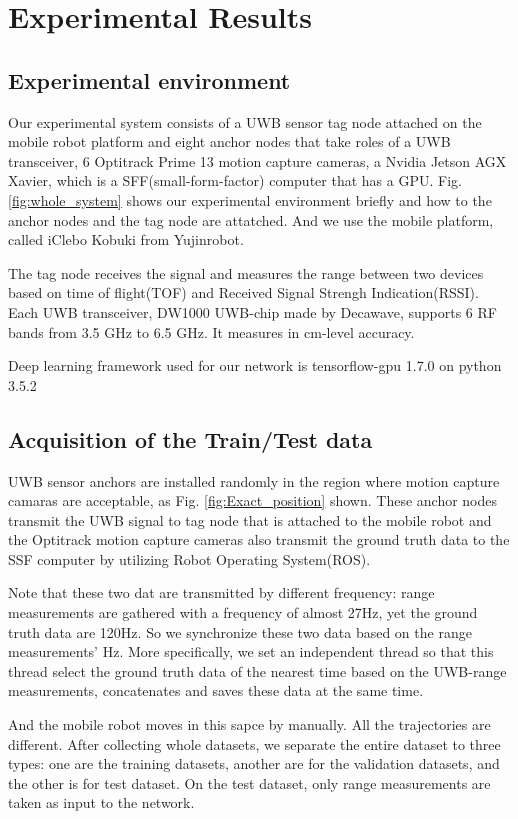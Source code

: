 \documentclass[letterpaper, 10 pt, conference]{ieeeconf}  %
\begin{document}
\section{Experimental Results}
\subsection{Experimental environment}

Our experimental system consists of a UWB sensor tag node attached on the mobile robot platform  and eight anchor nodes that take roles of a UWB transceiver, 6 Optitrack Prime 13 motion capture cameras, a Nvidia Jetson AGX Xavier, which is a SFF(small-form-factor) computer that has a GPU. Fig. \ref{fig:whole_system} shows our experimental environment briefly and how to the anchor nodes and the tag node are attatched. And we use the mobile platform, called iClebo Kobuki from Yujinrobot.

The tag node receives the signal and measures the range between two devices based on time of flight(TOF) and Received Signal Strengh Indication(RSSI). Each UWB transceiver, DW1000 UWB-chip made by Decawave, supports 6 RF bands from 3.5 GHz to 6.5 GHz. It measures in cm-level accuracy.

 Deep learning framework used for our network is tensorflow-gpu 1.7.0 on python 3.5.2
 
\subsection{Acquisition of the Train/Test data}
UWB sensor anchors are installed randomly in the region where motion capture camaras are acceptable, as Fig. \ref{fig:Exact_position} shown. These anchor nodes transmit the UWB signal to tag node that is attached to the mobile robot and the Optitrack motion capture cameras also transmit the ground truth data to the SSF computer by utilizing Robot Operating System(ROS).

Note that these two dat are transmitted by different frequency: range measurements are gathered with a frequency of almost 27Hz, yet the ground truth data are 120Hz. So we synchronize these two data based on the range measurements' Hz. More specifically, we set an independent thread so that this thread select the ground truth data of the nearest time based on the UWB-range measurements, concatenates and saves these data at the same time.

And the mobile robot moves in this sapce by manually. All the trajectories are different. After collecting whole datasets, we separate the entire dataset to three types: one are the training datasets, another are for the validation datasets, and the other is for test dataset. On the test dataset, only range measurements are taken as input to the network.
\end{document}
